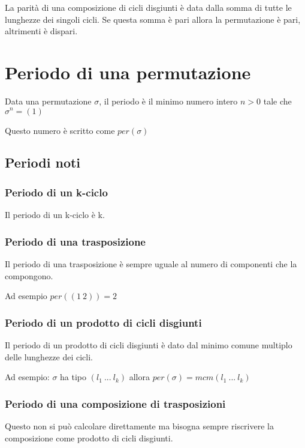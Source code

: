 \documentclass[a4paper, 10pt]{article}
\begin{document}
La parità di una composizione di cicli disgiunti è data dalla somma di tutte le lunghezze dei singoli cicli. Se questa somma è pari allora la permutazione è pari, altrimenti è dispari.

\section{Periodo di una permutazione}

Data una permutazione $\sigma$, il periodo è il minimo numero intero $n > 0$ tale che $\sigma^n=(1)$

Questo numero è scritto come $per(\sigma)$

\subsection{Periodi noti}

\subsubsection{Periodo di un k-ciclo}

Il periodo di un k-ciclo è k.

\subsubsection{Periodo di una trasposizione}

Il periodo di una trasposizione è sempre uguale al numero di componenti che la compongono.

Ad esempio $per((1\ 2)) = 2$

\subsubsection{Periodo di un prodotto di cicli disgiunti}

Il periodo di un prodotto di cicli disgiunti è dato dal minimo comune multiplo delle lunghezze dei cicli.

Ad esempio: $\sigma$ ha tipo $(l_1\ ... \ l_k)$ allora $per(\sigma) = mcm(l_1\ ... \ l_k)$

\subsubsection{Periodo di una composizione di trasposizioni}

Questo non si può calcolare direttamente ma bisogna sempre riscrivere la composizione come prodotto di cicli disgiunti.
\end{document}

